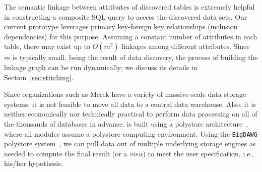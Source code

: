 The semantic linkage between attributes of discovered tables is extremely helpful in constructing a composite \textsf{SQL} query to access the discovered data sets. 
%
Our current prototype leverages primary key-foreign key relationships (inclusion dependencies) for this purpose.
Assuming a constant number of attributes in each table, there may exist up to $O(m^2)$ linkages among different attributes.
%
Since $m$ is typically small, being the result of data discovery,
the process of building the linkage graph can be run dynamically; we discuss its details in Section~\ref{sec:stitching}.



Since organizations such as  Merck have a variety of massive-scale data storage systems, it is not feasible to move all data to a central data warehouse. Also, it is neither economically nor technically practical to perform data processing on all of the thousands of databases in advance. 
\dcv is built using a polystore architecture~\cite{DBLP:journals/sigmod/DugganESBHKMMMZ15}, where all modules assume a polystore computing environment.
Using the \texttt{BigDAWG} polystore system~\cite{DBLP:journals/pvldb/ElmoreDSBCGHHKK15}, we can pull data out of multiple underlying storage engines as needed to compute the final result (or a {\em view}) to meet the user specification, i.e., his/her hypothesis. 



